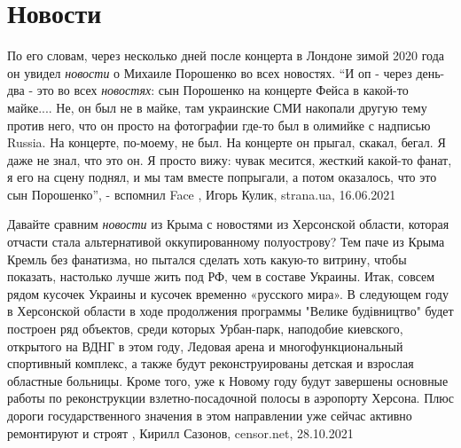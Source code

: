  
 
 
 
 
\chapter{Новости}
\label{sec:slova.novosti}

По его словам, через несколько дней после концерта в Лондоне зимой 2020 года он
увидел \emph{новости} о Михаиле Порошенко во всех новостях.  \enquote{И оп - через день-два -
это во всех \emph{новостях}: сын Порошенко на концерте Фейса в какой-то майке.... Не,
он был не в майке, там украинские СМИ накопали другую тему против него, что он
просто на фотографии где-то был в олимийке с надписью Russia. На концерте,
по-моему, не был. На концерте он прыгал, скакал, бегал. Я даже не знал, что это
он. Я просто вижу: чувак месится, жесткий какой-то фанат, я его на сцену
поднял, и мы там вместе попрыгали, а потом оказалось, что это сын Порошенко}, -
вспомнил Face
, 
Игорь Кулик, strana.ua, 16.06.2021

Давайте сравним \emph{новости} из Крыма с новостями из Херсонской области, которая
отчасти стала альтернативой оккупированному полуострову? Тем паче из Крыма
Кремль без фанатизма, но пытался сделать хоть какую-то витрину, чтобы показать,
настолько лучше жить под РФ, чем в составе Украины. Итак, совсем рядом кусочек
Украины и кусочек временно «русского мира». В следующем году в Херсонской
области в ходе продолжения программы "Велике будівництво" будет построен ряд
объектов, среди которых Урбан-парк, наподобие киевского, открытого на ВДНГ в
этом году, Ледовая арена и многофункциональный спортивный комплекс, а также
будут реконструированы детская и взрослая областные больницы. Кроме того, уже к
Новому году будут завершены основные работы по реконструкции взлетно-посадочной
полосы в аэропорту Херсона. Плюс дороги государственного значения в этом
направлении уже сейчас активно ремонтируют и строят 
, Кирилл Сазонов, censor.net, 28.10.2021%
